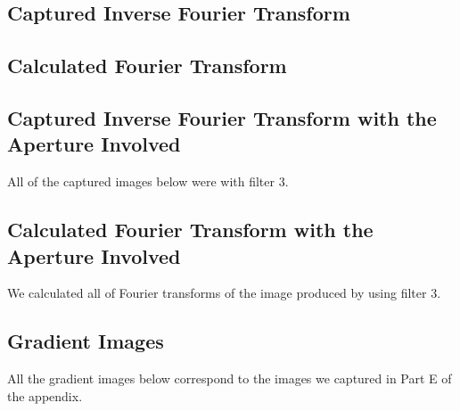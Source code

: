 \documentclass[twocolumn,amsmath,amssymb,pra]{revtex4-2}
\begin{document}
\subsection{Captured Inverse Fourier Transform}


\subsection{Calculated Fourier Transform}


\subsection{Captured Inverse Fourier Transform with the Aperture Involved}
All of the captured images below were with filter 3.


\subsection{Calculated Fourier Transform with the Aperture Involved}
We calculated all of Fourier transforms of the image produced by using filter 3.


\subsection{Gradient Images}
All the gradient images below correspond to the images we captured in Part E of the appendix.

\end{document}

